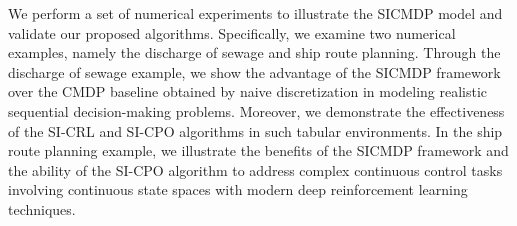 We perform a set of numerical experiments to illustrate the SICMDP model and validate our proposed algorithms.
Specifically, we examine two numerical examples, namely the discharge of sewage and ship route planning.
Through the discharge of sewage example, we show the advantage of the SICMDP framework over the CMDP baseline obtained by naive discretization in modeling realistic sequential decision-making problems.
Moreover, we demonstrate the effectiveness of the SI-CRL and SI-CPO algorithms in such tabular environments. 
In the ship route planning example, we illustrate the benefits of the SICMDP framework and the ability of the SI-CPO algorithm to address complex continuous control tasks involving continuous state spaces with modern deep reinforcement learning techniques.






